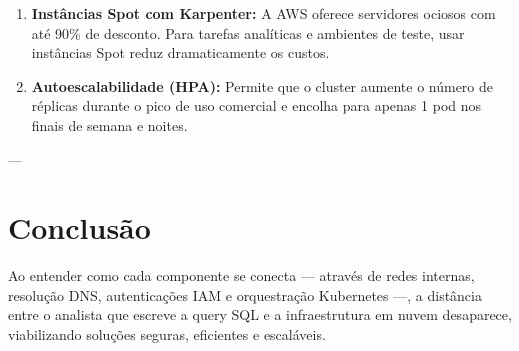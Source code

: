 \documentclass[11pt,a4paper]{article}
\begin{document}
\begin{tcolorbox}[colback=white,colframe=succgreen,title=\textbf{3. Como Economizar Dinheiro Real na AWS?},fonttitle=\bfseries]
\begin{enumerate}
    \item \textbf{Instâncias Spot com Karpenter:} A AWS oferece servidores ociosos com até 90\% de desconto. Para tarefas analíticas e ambientes de teste, usar instâncias Spot reduz dramaticamente os custos.
    \item \textbf{Autoescalabilidade (HPA):} Permite que o cluster aumente o número de réplicas durante o pico de uso comercial e encolha para apenas 1 pod nos finais de semana e noites.
\end{enumerate}
\end{tcolorbox}

---

\section{Conclusão}

Ao entender como cada componente se conecta — através de redes internas, resolução DNS, autenticações IAM e orquestração Kubernetes —, a distância entre o analista que escreve a query SQL e a infraestrutura em nuvem desaparece, viabilizando soluções seguras, eficientes e escaláveis.
\end{document}
